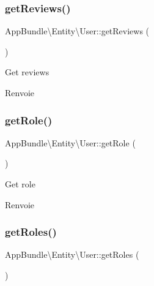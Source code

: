 \subsubsection{\texorpdfstring{get\+Reviews()}{getReviews()}}
{\footnotesize\ttfamily App\+Bundle\textbackslash{}\+Entity\textbackslash{}\+User\+::get\+Reviews (\begin{DoxyParamCaption}{ }\end{DoxyParamCaption})}

Get reviews

\begin{DoxyReturn}{Renvoie}

\end{DoxyReturn}
\mbox{\label{classAppBundle_1_1Entity_1_1User_a6481a9707a292bce8e9aebcf97f57721}} 
\subsubsection{\texorpdfstring{get\+Role()}{getRole()}}
{\footnotesize\ttfamily App\+Bundle\textbackslash{}\+Entity\textbackslash{}\+User\+::get\+Role (\begin{DoxyParamCaption}{ }\end{DoxyParamCaption})}

Get role

\begin{DoxyReturn}{Renvoie}

\end{DoxyReturn}
\mbox{\label{classAppBundle_1_1Entity_1_1User_a7feac9233be86c6fd93280a891905a2b}} 
\subsubsection{\texorpdfstring{get\+Roles()}{getRoles()}}
{\footnotesize\ttfamily App\+Bundle\textbackslash{}\+Entity\textbackslash{}\+User\+::get\+Roles (\begin{DoxyParamCaption}{ }\end{DoxyParamCaption})}

